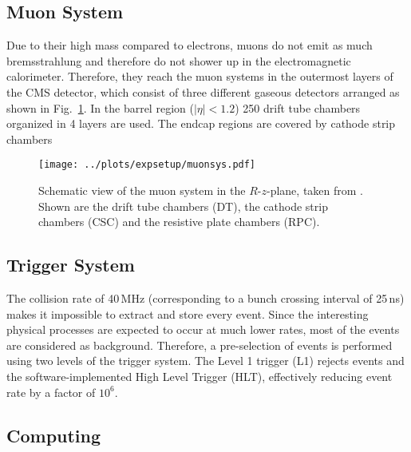 \subsection*{Muon System}
Due to their high mass compared to electrons, muons do not emit as much bremsstrahlung and therefore do not shower up in the electromagnetic calorimeter. Therefore, they reach the muon systems in the outermost layers of the CMS detector, which consist of three different gaseous detectors arranged as shown in Fig.~\ref{fig:expsetup:muonsys}. In the barrel region ($|\eta|<1.2$) 250 drift tube chambers organized in 4 layers are used. The endcap regions are covered by cathode strip chambers
\begin{figure}
    \centering
    \texttt{[image: ../plots/expsetup/muonsys.pdf]}
    \caption[Schematic view of the muon system in the $R$-$z$-plane]{Schematic view of the muon system in the $R$-$z$-plane, taken from \cite{CMS_design}. Shown are the drift tube chambers (DT), the cathode strip chambers (CSC) and the resistive plate chambers (RPC).}
    \label{fig:expsetup:muonsys}
\end{figure}
\subsection*{Trigger System}
The collision rate of 40\,MHz (corresponding to a bunch crossing interval of 25\,ns) makes it impossible to extract and store every event. Since the interesting physical processes are expected to occur at much lower rates, most of the events are considered as background. Therefore, a pre-selection of events is performed using two levels of the trigger system. The Level 1 trigger (L1) rejects events 
and the software-implemented High Level Trigger (HLT), effectively reducing event rate by a factor of $10^6$.
\subsection*{Computing}
